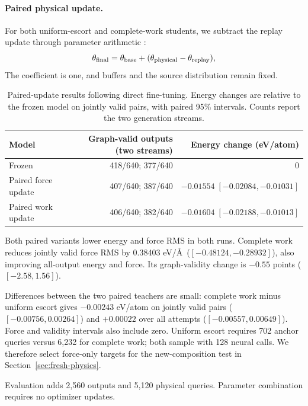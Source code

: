 \paragraph{Paired physical update.}
For both uniform-escort and complete-work students, we subtract the replay update through parameter arithmetic \citep{ilharco2023arithmetic}:
\begin{equation}
 \theta_{\rm final}=\theta_{\rm base}
   +(\theta_{\rm physical}-\theta_{\rm replay}),
\end{equation}
The coefficient is one, and buffers and the source distribution remain fixed.

\begin{table}[t]
\centering
\caption{Paired-update results following direct fine-tuning. Energy changes are relative to the frozen model on jointly valid pairs, with paired 95\% intervals. Counts report the two generation streams.}
\begin{tabular}{lrr}
\toprule
Model & Graph-valid outputs (two streams) & Energy change (eV/atom)\\
\midrule
Frozen &418/640; 377/640&$0$\\
Paired force update &407/640; 387/640&$-0.01554\;[-0.02084,-0.01031]$\\
Paired work update &406/640; 382/640&$-0.01604\;[-0.02188,-0.01013]$\\
\bottomrule
\end{tabular}\label{tab:thermal-transfer}
\end{table}

Both paired variants lower energy and force RMS in both runs. Complete work reduces jointly valid force RMS by 0.38403 eV/\AA\ ($[-0.48124,-0.28932]$), also improving all-output energy and force. Its graph-validity change is $-0.55$ points ($[-2.58,1.56]$).

Differences between the two paired teachers are small: complete work minus uniform escort gives $-0.00243$ eV/atom on jointly valid pairs ($[-0.00756,0.00264]$) and $+0.00022$ over all attempts ($[-0.00557,0.00649]$). Force and validity intervals also include zero. Uniform escort requires 702 anchor queries versus 6,232 for complete work; both sample with 128 neural calls. We therefore select force-only targets for the new-composition test in Section~\ref{sec:fresh-physics}.

Evaluation adds 2,560 outputs and 5,120 physical queries. Parameter combination requires no optimizer updates.
